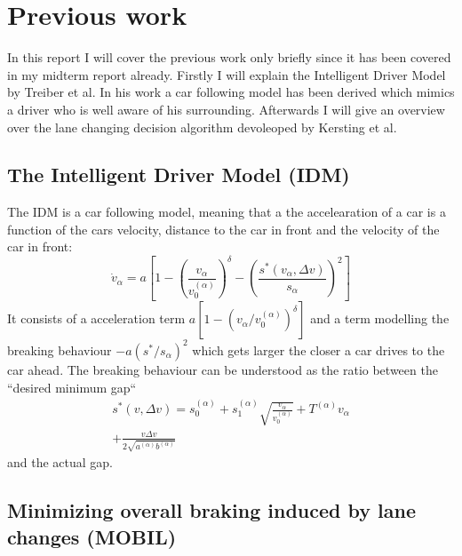 \section{Previous work}
\label{sec:previous_work}
In this report I will cover the previous work only briefly since it has been covered in my midterm report already.
Firstly I will explain the Intelligent Driver Model by Treiber et al. In his work a car following model has been derived
which mimics a driver who is well aware of his surrounding. Afterwards I will give an overview over the lane changing
decision algorithm devoleoped by Kersting et al.

\subsection{The Intelligent Driver Model (IDM)}
\label{sec:idm}
The IDM is a car following model, meaning that a the accelearation of a car is a function of the cars velocity,
distance to the car in front and the velocity of the car in front:
\begin{equation}
  \dot v_\alpha = a \left[1 - \left(\frac{v_\alpha}{v_0^{(\alpha)}}\right)^\delta -
    \left(\frac{s^*(v_\alpha, \Delta v)}{s_\alpha}\right)^2
  \right]
  \label{eqn:idm:sprime}
\end{equation}
It consists of a acceleration term $a [1 - (v_\alpha / v_0^{(\alpha)})^\delta]$ and a term modelling the breaking
behaviour $-a (s^* / s_\alpha)^2$ which gets larger the closer a car drives to the car ahead. The breaking behaviour
can be understood as the ratio between the ``desired minimum gap``
\begin{multline}
  s^*(v, \Delta v) = s_0^{(\alpha)} + s_1^{(\alpha)} \sqrt{\frac{v_\alpha}{v_0^{(\alpha)}}} + T^{(\alpha)}v_\alpha
  \\
  + \frac{v\Delta v}{2 \sqrt{a^{(\alpha)} b^{(\alpha)}}}
\end{multline}
and the actual gap.

\subsection{Minimizing overall braking induced by lane changes (MOBIL)}
\label{sec:mobil}
